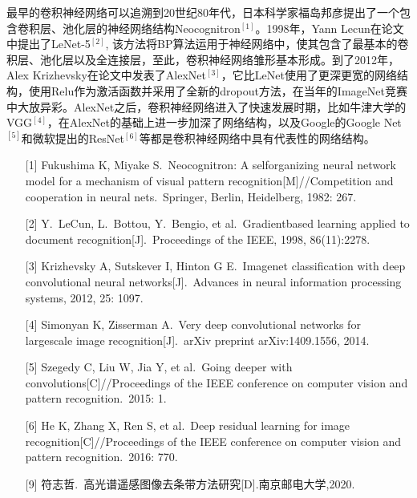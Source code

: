 \documentclass[UTF8,zihao=-4]{oucart}
\begin{document}
    \begin{framed}
        最早的卷积神经网络可以追溯到20世纪80年代，日本科学家福岛邦彦提出了一个包含卷积层、池化层的神经网络结构Neocognitron$^{[1]}$。1998年，Yann Lecun在论文中提出了LeNet-5$^{[2]}$, 该方法将BP算法运用于神经网络中，使其包含了最基本的卷积层、池化层以及全连接层，至此，卷积神经网络雏形基本形成。到了2012年，Alex Krizhevsky在论文中发表了AlexNet$^{[3]}$，它比LeNet使用了更深更宽的网络结构，使用Relu作为激活函数并采用了全新的dropout方法，在当年的ImageNet竞赛中大放异彩。AlexNet之后，卷积神经网络进入了快速发展时期，比如牛津大学的VGG$^{[4]}$，在AlexNet的基础上进一步加深了网络结构，以及Google的Google Net$^{[5]}$和微软提出的ResNet$^{[6]}$等都是卷积神经网络中具有代表性的网络结构。

        \begin{itemize}
            \item[{[1]}]
            Fukushima K, Miyake S.\ Neocognitron: A self\-organizing neural network model for a mechanism of visual pattern recognition[M]//Competition and cooperation in neural nets.\ Springer, Berlin, Heidelberg, 1982: 267.

            \item[{[2]}]
            Y.\ LeCun, L.\ Bottou, Y.\ Bengio, et al.\ Gradient\-based learning applied to document recognition[J].\ Proceedings of the IEEE, 1998, 86(11):2278.

            \item[{[3]}]
            Krizhevsky A, Sutskever I, Hinton G E.\ Imagenet classification with deep convolutional neural networks[J].\ Advances in neural information processing systems, 2012, 25: 1097.

            \item[{[4]}]
            Simonyan K, Zisserman A.\ Very deep convolutional networks for large\-scale image recognition[J].\ arXiv preprint arXiv:1409.1556, 2014.

            \item[{[5]}]
            Szegedy C, Liu W, Jia Y, et al.\ Going deeper with convolutions[C]//Proceedings of the IEEE conference on computer vision and pattern recognition.\ 2015: 1.

            \item[{[6]}]
            He K, Zhang X, Ren S, et al.\ Deep residual learning for image recognition[C]//Proceedings of the IEEE conference on computer vision and pattern recognition.\ 2016: 770.

            \item[{[9]}]
            符志哲.\ 高光谱遥感图像去条带方法研究[D].南京邮电大学,2020.

        \end{itemize}


    \end{framed}
\end{document}
